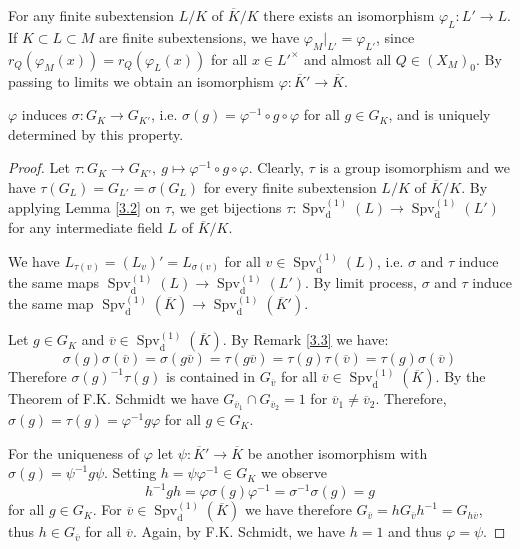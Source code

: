 \begin{remark}
For any finite subextension $L/K$ of $\overline{K}/K$ there exists an isomorphism $\varphi_L: L'\to L$. If $K\subset L\subset M$ are finite subextensions, we have $\varphi_M|_{L'} = \varphi_{L'}$, since $r_Q(\varphi_M(x)) = r_Q(\varphi_L(x))$ for all $x\in L'^\times$ and almost all $Q\in (X_M)_0$. By passing to limits we obtain an isomorphism $\varphi: \overline{K}'\to \overline{K}$.
\end{remark}

\begin{step}
$\varphi$ induces $\sigma:G_K\to G_{K'}$, i.e. $\sigma(g) = \varphi^{-1}\circ g\circ \varphi$ for all $g\in G_K$, and is uniquely determined by this property.
\end{step}

\begin{proof}
Let $\tau:G_K\to G_{K'},\ g\mapsto \varphi^{-1}\circ g\circ \varphi$. Clearly, $\tau$ is a group isomorphism and we have $\tau(G_L)=G_{L'}=\sigma(G_L)$ for every finite subextension $L/K$ of $\overline{K}/K$. By applying Lemma \ref{3.2} on $\tau$, we get bijections $\tau: \operatorname{Spv}_\text{d}^{(1)}(L)\to \operatorname{Spv}_\text{d}^{(1)}(L')$ for any intermediate field $L$ of $\overline{K}/K$.

We have $L_{\tau(v)} = (L_v)' = L_{\sigma(v)}$ for all $v\in\operatorname{Spv}_\text{d}^{(1)}(L)$, i.e. $\sigma$ and $\tau$ induce the same maps $\operatorname{Spv}_\text{d}^{(1)}(L)\to \operatorname{Spv}_\text{d}^{(1)}(L')$. By limit process, $\sigma$ and $\tau$ induce the same map $\operatorname{Spv}_\text{d}^{(1)}(\overline{K})\to \operatorname{Spv}_\text{d}^{(1)}(\overline{K}')$.

Let $g\in G_K$ and $\overline{v}\in\operatorname{Spv}_\text{d}^{(1)}(\overline{K})$. By Remark \ref{3.3} we have:
\[ \sigma(g)\sigma(\overline{v}) = \sigma(g\overline{v}) = \tau(g\overline{v}) = \tau(g)\tau(\overline{v}) = \tau(g) \sigma(\overline{v}) \]
Therefore $\sigma(g)^{-1}\tau(g)$ is contained in $G_{\overline{v}}$ for all $\overline{v}\in\operatorname{Spv}_\text{d}^{(1)}(\overline{K})$. By the Theorem of F.K. Schmidt we have $G_{\overline{v}_1}\cap G_{\overline{v}_2} = 1$ for $\overline{v}_1\neq\overline{v}_2$. Therefore, $\sigma(g) = \tau(g) = \varphi^{-1}g\varphi$ for all $g\in G_K$.

For the uniqueness of $\varphi$ let $\psi: \overline{K}'\to \overline{K}$ be another isomorphism with $\sigma(g) = \psi^{-1} g \psi$. Setting $h = \psi\varphi^{-1}\in G_K$ we observe
\[ h^{-1}gh = \varphi\sigma(g)\varphi^{-1} = \sigma^{-1}\sigma(g) = g \]
for all $g\in G_K$. For $\overline{v}\in\operatorname{Spv}_\text{d}^{(1)}(\overline{K})$ we have therefore $G_{\overline{v}} = h G_{\overline{v}} h^{-1} = G_{h\overline{v}}$, thus $h\in G_{\overline{v}}$ for all $\overline{v}$. Again, by F.K. Schmidt, we have $h=1$ and thus $\varphi = \psi$.
\end{proof}

